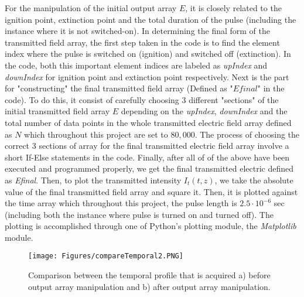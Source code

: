 For the manipulation of the initial output array $E$, it is closely related to the ignition point, extinction point and the total duration of the pulse (including the instance where it is not switched-on). In determining the final form of the transmitted field array, the first step taken in the code is to find the element index where the pulse is switched on (ignition) and switched off (extinction). In the code, both this important element indices are labeled as \textit{upIndex} and \textit{downIndex} for ignition point and extinction point respectively. Next is the part for "constructing" the final transmitted field array (Defined as "$Efinal$" in the code). To do this, it consist of carefully choosing 3 different "sections" of the initial transmitted field array $E$ depending on the \textit{upIndex}, \textit{downIndex} and the total number of data points in the whole transmitted electric field array defined as $N$ which throughout this project are set to $80,000$. The process of choosing the correct 3 sections of array for the final transmitted electric field array involve a short If-Else statements in the code. Finally, after all of of the above have been executed and programmed properly, we get the final transmitted electric defined as \textit{Efinal}. Then, to plot the transmitted intensity $I_{t}(t, z)$, we take the absolute value of the final transmitted field array and square it. Then, it is plotted against the time array which throughout this project, the pulse length is $2.5 \cdot 10^{-6}$ sec (including both the instance where pulse is turned on and turned off). The plotting is accomplished through one of Python's plotting module, the \textit{Matplotlib} module.

\begin{figure}[h!]
    \centering
    \texttt{[image: Figures/compareTemporal2.PNG]}
    \caption{Comparison between the temporal profile that is acquired a) before output array manipulation and b) after output array manipulation.}
    \label{fig: compare temporal}
\end{figure}

